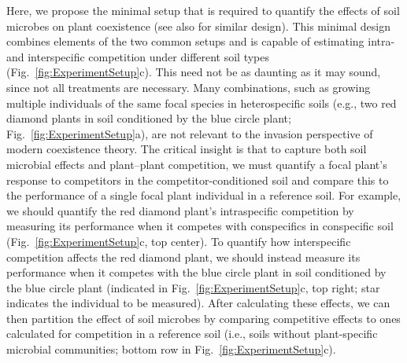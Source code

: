 Here, we propose the minimal setup that is required to quantify the effects of soil microbes on plant coexistence (see also \citealt{Hart2018} for similar design).
This minimal design combines elements of the two common setups and is capable of estimating intra- and interspecific competition under different soil types (Fig.~\ref{fig:ExperimentSetup}c).
This need not be as daunting as it may sound, since not all treatments are necessary. Many combinations, such as growing multiple individuals of the same focal species in heterospecific soils (e.g., two red diamond plants in soil conditioned by the blue circle plant; Fig.~\ref{fig:ExperimentSetup}a), are not relevant to the invasion perspective of modern coexistence theory.
The critical insight is that to capture both soil microbial effects and plant--plant competition, we must quantify a focal plant's response to competitors in the competitor-conditioned soil and compare this to the performance of a single focal plant individual in a reference soil.
For example, we should quantify the red diamond plant's intraspecific competition by measuring its performance when it competes with conspecifics in conspecific soil (Fig.~\ref{fig:ExperimentSetup}c, top center). To quantify how interspecific competition affects the red diamond plant, we should instead measure its performance when it competes with the blue circle plant in soil conditioned by the blue circle plant (indicated in Fig.~\ref{fig:ExperimentSetup}c, top right; star indicates the individual to be measured).
After calculating these effects, we can then partition the effect of soil microbes by comparing competitive effects to ones calculated for competition in a reference soil (i.e., soils without plant-specific microbial communities; bottom row in Fig.~\ref{fig:ExperimentSetup}c).
\par


